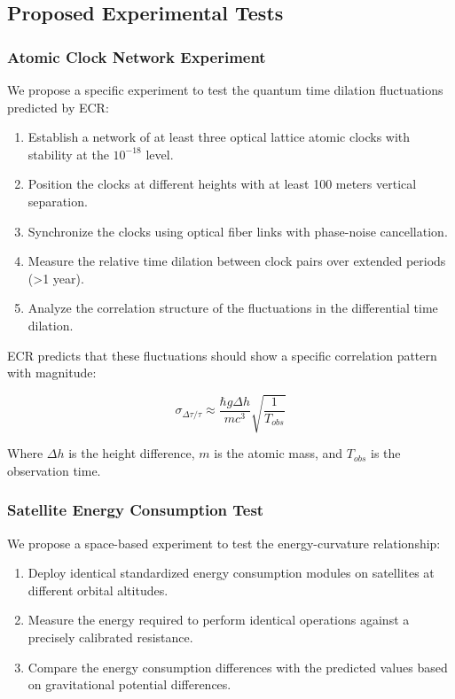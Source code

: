 \documentclass[11pt,a4paper]{article}
\begin{document}
\subsection{Proposed Experimental Tests}

\subsubsection{Atomic Clock Network Experiment}

We propose a specific experiment to test the quantum time dilation fluctuations predicted by ECR:

\begin{enumerate}
    \item Establish a network of at least three optical lattice atomic clocks with stability at the $10^{-18}$ level.
    
    \item Position the clocks at different heights with at least 100 meters vertical separation.
    
    \item Synchronize the clocks using optical fiber links with phase-noise cancellation.
    
    \item Measure the relative time dilation between clock pairs over extended periods (>1 year).
    
    \item Analyze the correlation structure of the fluctuations in the differential time dilation.
\end{enumerate}

ECR predicts that these fluctuations should show a specific correlation pattern with magnitude:

\begin{equation}
    \sigma_{\Delta\tau/\tau} \approx \frac{\hbar g \Delta h}{mc^3} \sqrt{\frac{1}{T_{obs}}}
\end{equation}

Where $\Delta h$ is the height difference, $m$ is the atomic mass, and $T_{obs}$ is the observation time.

\subsubsection{Satellite Energy Consumption Test}

We propose a space-based experiment to test the energy-curvature relationship:

\begin{enumerate}
    \item Deploy identical standardized energy consumption modules on satellites at different orbital altitudes.
    
    \item Measure the energy required to perform identical operations against a precisely calibrated resistance.
    
    \item Compare the energy consumption differences with the predicted values based on gravitational potential differences.
\end{enumerate}
\end{document}
